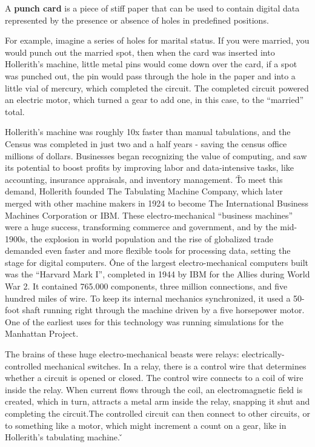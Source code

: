 A \textbf{punch card} is a piece of stiff paper that can be used to contain digital data represented by the presence
or absence of holes in predefined positions.
\ed

\be
For example, imagine a series of holes for marital status. If you were married, you would punch out the married
spot, then when the card was inserted into Hollerith's machine, little metal pins would come down over the card, if a
spot was punched out, the pin would pass through the hole in the paper and into a little vial of mercury, which
completed the circuit. The completed circuit powered an electric motor, which turned a gear to add one, in this
case, to the ``married'' total.
\ee

Hollerith's machine was roughly 10x faster than manual tabulations, and the Census was completed in just two and a
half years - saving the census office millions of dollars. Businesses began recognizing the value of computing, and
saw its potential to boost profits by improving labor and data-intensive tasks, like accounting, insurance
appraisals, and inventory management. \v

To meet this demand, Hollerith founded The Tabulating Machine Company, which later merged with other machine makers
in 1924 to become The International Business Machines Corporation or IBM. These electro-mechanical ``business
machines'' were a huge success, transforming commerce and government, and by the mid-1900s, the explosion in world
population and the rise of globalized trade demanded even faster and more flexible tools for processing data, setting
the stage for digital computers. \v

One of the largest electro-mechanical computers built was the ``Harvard Mark I'', completed in 1944 by IBM for the
Allies during World War 2. It contained 765.000 components, three million connections, and five hundred miles of wire.
To keep its internal mechanics synchronized, it used a 50-foot shaft running right through the machine driven by a
five horsepower motor. One of the earliest uses for this technology was running simulations for the Manhattan Project.


The brains of these huge electro-mechanical beasts were relays: electrically-controlled mechanical switches. In a
relay, there is a control wire that determines whether a circuit is opened or closed. The control wire connects to a
coil of wire inside the relay. When current flows through the coil, an electromagnetic field is created, which in
turn, attracts a metal arm inside the relay, snapping it shut and completing the circuit.The controlled circuit can
then connect to other circuits, or to something like a motor, which might increment a count on a gear, like in
Hollerith's tabulating machine. \v

